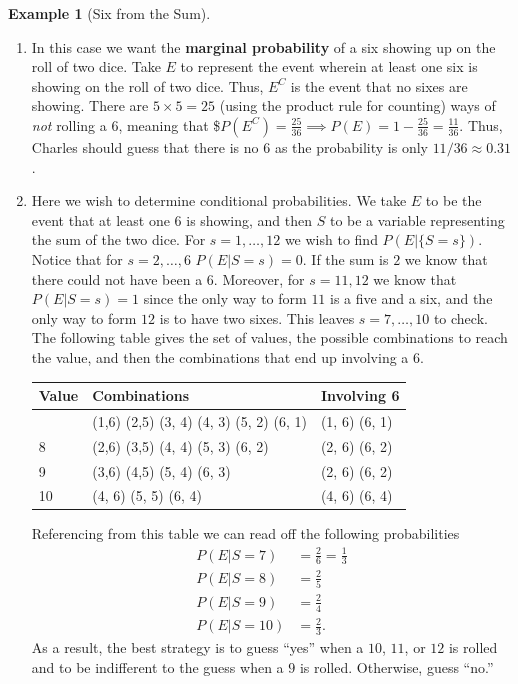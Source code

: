 \documentclass[
  letterpaper,
  DIV=11,
  numbers=noendperiod]{scrreprt}
\theoremstyle{definition}
\theoremstyle{definition}
\newtheorem{example}{Example}[chapter]
\theoremstyle{definition}
\theoremstyle{remark}
\begin{document}
\begin{example}[Six from the
Sum]
\begin{tcolorbox}[enhanced jigsaw, colback=white, colframe=quarto-callout-color-frame, arc=.35mm, leftrule=.75mm, rightrule=.15mm, opacityback=0, breakable, bottomrule=.15mm, left=2mm, toprule=.15mm]
\begin{enumerate}
\def\labelenumi{\alph{enumi}.}
\item
  In this case we want the \textbf{marginal probability} of a six
  showing up on the roll of two dice. Take \(E\) to represent the event
  wherein at least one six is showing on the roll of two dice. Thus,
  \(E^C\) is the event that no sixes are showing. There are
  \(5\times 5=25\) (using the product rule for counting) ways of
  \emph{not} rolling a \(6\), meaning that
  \$\(P(E^C) = \frac{25}{36} \implies P(E) = 1 - \frac{25}{36} = \frac{11}{36}\).
  Thus, Charles should guess that there is no \(6\) as the probability
  is only \(11/36 \approx 0.31\).
\item
  Here we wish to determine conditional probabilities. We take \(E\) to
  be the event that at least one \(6\) is showing, and then \(S\) to be
  a variable representing the sum of the two dice. For
  \(s= 1, \dots, 12\) we wish to find \(P(E|\{S=s\})\). Notice that for
  \(s=2,\dots,6\) \(P(E|S=s) = 0\). If the sum is \(2\) we know that
  there could not have been a \(6\). Moreover, for \(s=11,12\) we know
  that \(P(E|S=s) = 1\) since the only way to form \(11\) is a five and
  a six, and the only way to form \(12\) is to have two sixes. This
  leaves \(s = 7,\dots,10\) to check. The following table gives the set
  of values, the possible combinations to reach the value, and then the
  combinations that end up involving a \(6\).

  \begin{longtable}[]{@{}lll@{}}
  \toprule\noalign{}
  Value & Combinations & Involving 6 \\
  \midrule\noalign{}
  \endhead
  \bottomrule\noalign{}
  \endlastfoot
  7 & (1,6) (2,5) (3, 4) (4, 3) (5, 2) (6, 1) & (1, 6) (6, 1) \\
  8 & (2,6) (3,5) (4, 4) (5, 3) (6, 2) & (2, 6) (6, 2) \\
  9 & (3,6) (4,5) (5, 4) (6, 3) & (2, 6) (6, 2) \\
  10 & (4, 6) (5, 5) (6, 4) & (4, 6) (6, 4) \\
  \end{longtable}

  Referencing from this table we can read off the following
  probabilities \begin{align*}
  P(E|S=7) &= \frac{2}{6} = \frac{1}{3}\\
  P(E|S=8) &= \frac{2}{5} \\
  P(E|S=9) &= \frac{2}{4} \\
  P(E|S=10) &= \frac{2}{3}.
  \end{align*} As a result, the best strategy is to guess ``yes'' when a
  \(10\), \(11\), or \(12\) is rolled and to be indifferent to the guess
  when a \(9\) is rolled. Otherwise, guess ``no.''
\end{enumerate}

\end{tcolorbox}

\end{example}
\end{document}
